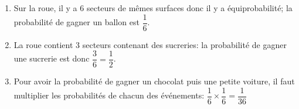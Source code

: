 
\medskip

%
%
%
%
%

\begin{enumerate}
\item Sur la roue, il y a 6 secteurs de mêmes surfaces donc il y a équiprobabilité; la probabilité de gagner un ballon est
$\dfrac{1}{6}$.

\item
La roue contient 3 secteurs contenant des sucreries: la probabilité de gagner une sucrerie est donc $\dfrac{3}{6} = \dfrac{1}{2}$.

\item
Pour avoir la probabilité de gagner un chocolat puis une petite voiture, il faut multiplier les probabilités de chacun des événements:
$\dfrac{1}{6}\times \dfrac{1}{6}=\dfrac{1}{36}$

\end{enumerate}


